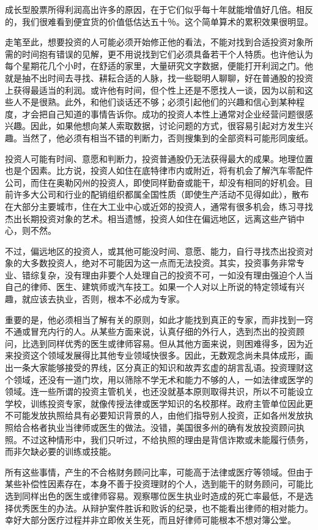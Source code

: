 \documentclass[UTF8,a4paper,zihao=-4,fontset = windows]{ctexart} %
\begin{document}
成长型股票所得利润高出许多的原因，在于它们似乎每十年就能增值好几倍。相反的，我们很难看到便宜货的价值低估达五十％。这个简单算术的累积效果很明显。

走笔至此，想要投资的人可能必须开始修正他的看法，不能对找到合适投资对象所需的时间抱有错误的见解，更不用说找到它们必须具备若干个人特质。也许他认为每个星期花几个小时，在舒适的家里，大量研究文字数据，便能打开利润之门。他就是抽不出时间去寻找、耕耘合适的人脉，找一些聪明人聊聊，好在普通股的投资上获得最适当的利润。或许他有时间，但个性上还是不愿找人一谈，因为以前和这些人不是很熟。此外，和他们谈话还不够；必须引起他们的兴趣和信心到某种程度，才会把自己知道的事情告诉你。成功的投资人本性上通常对企业经营问题很感兴趣。因此，如果他想向某人索取数据，讨论问题的方式，很容易引起对方发生兴趣。当然了，他必须有相当不错的判断力，否则搜集到的全部资料可能形同废纸。

投资人可能有时间、意愿和判断力，投资普通股仍无法获得最大的成果。地理位置也是个因素。比方说，投资人如住在底特律市内或附近，将有机会了解汽车零配件公司，而住在奥勒冈州的投资人，即使同样勤奋或能干，却没有相同的好机会。目前许多大公司和行业的配销组织都属全国性质（即使生产活动不见得如此），散布在大部分主要城市，住在大工业中心或近郊的投资人，通常有很多机会，练习寻找杰出长期投资对象的艺术。相当遗憾，投资人如住在偏远地区，远离这些产销中心，则不然。

不过，偏远地区的投资人，或其他可能没时间、意愿、能力，自行寻找杰出投资对象的大多数投资人，绝对不可能因为这一点而无法投资。其实，投资事务非常专业、错综复杂，没有理由非要个人处理自己的投资不可，一如没有理由强迫个人当自己的律师、医生、建筑师或汽车技工。如果一个人对以上所说的特定领域有兴趣，就应该去执业，否则，根本不必成为专家。

重要的是，他必须相当了解有关的原则，如此才能找到真正的专家，而非找到一窍不通或冒充内行的人。从某些方面来说，认真仔细的外行人，选到杰出的投资顾问，比选到同样优秀的医生或律师容易。但从其他方面来说，则困难得多，因为近来投资这个领域发展得比其他专业领域快很多。因此，无数观念尚未具体成形，画出一条大家能够接受的界线，区分真正的知识和故弄玄虚的胡言乱语。投资理财这个领域，还没有一道门坎，用以筛除不学无术和能力不够的人，一如法律或医学的领域。连一些所谓的投资主管机关，也还没就基本原则取得共识，所以不可能设立学校，训练投资专家，就像传授法律或医学知识的名校那样。政府主管单位因此更不可能发放执照给具有必要知识背景的人，由他们指导别人投资，正如各州发放执照给合格者执业当律师或医生的做法。没错，美国很多州的确有发放投资顾问执照。不过这种情形中，我们只听过，不给执照的理由是背信诈欺或未能履行债务，而非欠缺必要的训练或技能。

所有这些事情，产生的不合格财务顾问比率，可能高于法律或医疗等领域。但由于某些补偿性因素存在，本身不善于投资理财的个人，选到能干的财务顾问，可能比选到同样出色的医生或律师容易。观察哪位医生执业时造成的死亡率最低，不是选择优秀医生的办法。从辩护案件胜诉和败诉的纪录，也不能看出律师的相对能力。幸好大部分医疗过程并非立即攸关生死，而且好律师可能根本不想对簿公堂。
\end{document}
